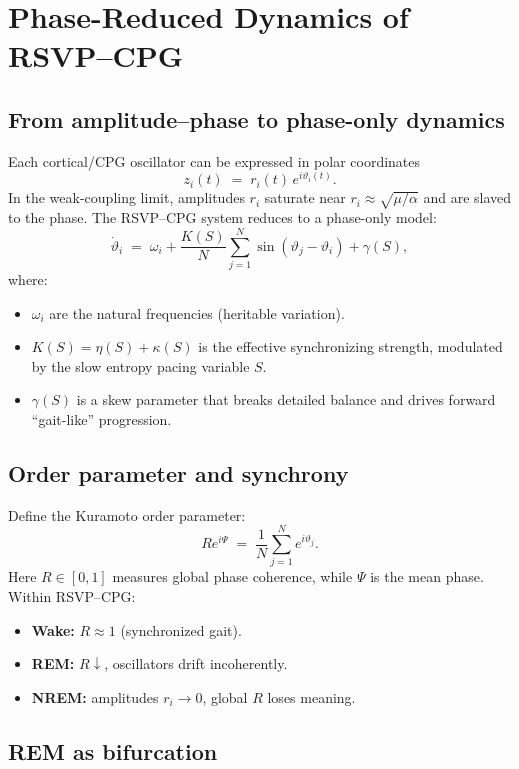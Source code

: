 \documentclass{article}
\begin{document}
\section{Phase-Reduced Dynamics of RSVP--CPG}

\subsection{From amplitude--phase to phase-only dynamics}

Each cortical/CPG oscillator can be expressed in polar coordinates
\[
z_i(t) \;=\; r_i(t)\,e^{i\vartheta_i(t)}.
\]
In the weak-coupling limit, amplitudes $r_i$ saturate near
$r_i \approx \sqrt{\mu/\alpha}$ and are slaved to the phase.
The RSVP--CPG system reduces to a phase-only model:
\begin{equation}
\dot{\vartheta}_i \;=\; \omega_i
+ \frac{K(S)}{N} \sum_{j=1}^N \sin(\vartheta_j - \vartheta_i)
+ \gamma(S),
\label{eq:phase}
\end{equation}
where:
\begin{itemize}
\item $\omega_i$ are the natural frequencies (heritable variation).
\item $K(S) = \eta(S) + \kappa(S)$ is the effective synchronizing strength,
modulated by the slow entropy pacing variable $S$.
\item $\gamma(S)$ is a skew parameter that breaks detailed balance and drives
forward ``gait-like'' progression.
\end{itemize}

\subsection{Order parameter and synchrony}

Define the Kuramoto order parameter:
\[
R e^{i\Psi} \;=\; \frac{1}{N} \sum_{j=1}^N e^{i\vartheta_j}.
\]
Here $R \in [0,1]$ measures global phase coherence, while $\Psi$ is the mean
phase.  
Within RSVP--CPG:
\begin{itemize}
\item \textbf{Wake:} $R \approx 1$ (synchronized gait).
\item \textbf{REM:} $R \downarrow$, oscillators drift incoherently.
\item \textbf{NREM:} amplitudes $r_i \to 0$, global $R$ loses meaning.
\end{itemize}

\subsection{REM as bifurcation}
\end{document}
